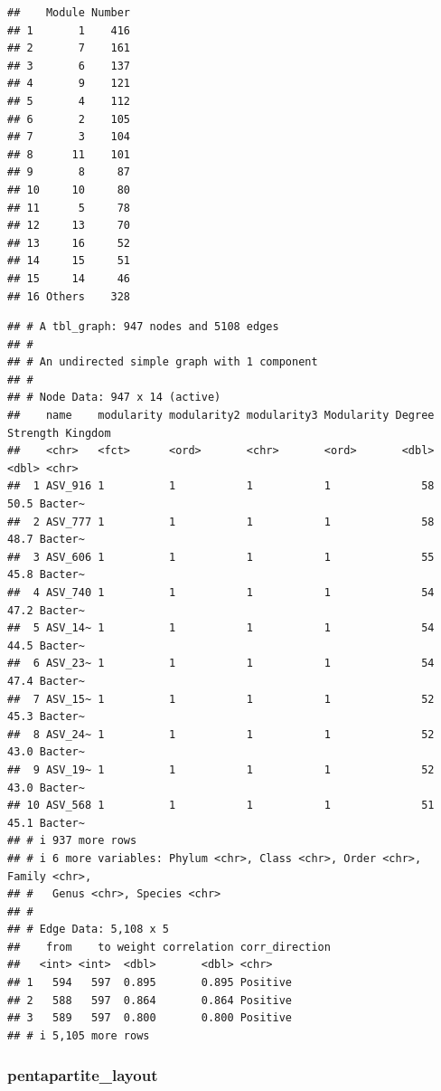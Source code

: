\documentclass[
]{book}
\newenvironment{Shaded}{\begin{snugshade}}{\end{snugshade}}
\newcommand{\NormalTok}[1]{#1}
\newcommand{\SpecialCharTok}[1]{\textcolor[rgb]{0.81,0.36,0.00}{\textbf{#1}}}
\begin{document}
\begin{verbatim}
##    Module Number
## 1       1    416
## 2       7    161
## 3       6    137
## 4       9    121
## 5       4    112
## 6       2    105
## 7       3    104
## 8      11    101
## 9       8     87
## 10     10     80
## 11      5     78
## 12     13     70
## 13     16     52
## 14     15     51
## 15     14     46
## 16 Others    328
\end{verbatim}

\begin{Shaded}
\end{Shaded}

\begin{verbatim}
## # A tbl_graph: 947 nodes and 5108 edges
## #
## # An undirected simple graph with 1 component
## #
## # Node Data: 947 x 14 (active)
##    name    modularity modularity2 modularity3 Modularity Degree Strength Kingdom
##    <chr>   <fct>      <ord>       <chr>       <ord>       <dbl>    <dbl> <chr>  
##  1 ASV_916 1          1           1           1              58     50.5 Bacter~
##  2 ASV_777 1          1           1           1              58     48.7 Bacter~
##  3 ASV_606 1          1           1           1              55     45.8 Bacter~
##  4 ASV_740 1          1           1           1              54     47.2 Bacter~
##  5 ASV_14~ 1          1           1           1              54     44.5 Bacter~
##  6 ASV_23~ 1          1           1           1              54     47.4 Bacter~
##  7 ASV_15~ 1          1           1           1              52     45.3 Bacter~
##  8 ASV_24~ 1          1           1           1              52     43.0 Bacter~
##  9 ASV_19~ 1          1           1           1              52     43.0 Bacter~
## 10 ASV_568 1          1           1           1              51     45.1 Bacter~
## # i 937 more rows
## # i 6 more variables: Phylum <chr>, Class <chr>, Order <chr>, Family <chr>,
## #   Genus <chr>, Species <chr>
## #
## # Edge Data: 5,108 x 5
##    from    to weight correlation corr_direction
##   <int> <int>  <dbl>       <dbl> <chr>         
## 1   594   597  0.895       0.895 Positive      
## 2   588   597  0.864       0.864 Positive      
## 3   589   597  0.800       0.800 Positive      
## # i 5,105 more rows
\end{verbatim}

\subsubsection{pentapartite\_layout}\label{pentapartite_layout}
\end{document}
